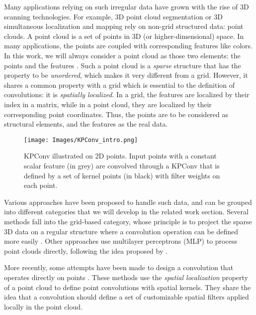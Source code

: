 \documentclass[10pt,twocolumn,letterpaper]{article}
\begin{document}
Many applications relying on such irregular data have grown with the rise of 3D scanning technologies. For example, 3D point cloud segmentation or 3D simultaneous localization and mapping rely on non-grid structured data: point clouds. A point cloud is a set of points in 3D (or higher-dimensional) space. In many applications, the points are coupled with corresponding features like colors. In this work, we will always consider a point cloud as those two elements: the points  and the features . Such a point cloud is a \textit{sparse} structure that has the property to be \textit{unordered}, which makes it very different from a grid. However, it shares a common property with a grid which is essential to the definition of convolutions: it is \textit{spatially localized}. In a grid, the features are localized by their index in a matrix, while in a point cloud, they are localized by their corresponding point coordinates. Thus, the points are to be considered as structural elements, and the features as the real data.

\begin{figure}[b]
    \vspace{-3.5ex}
    \centering
    \texttt{[image: Images/KPConv\_intro.png]}
    \caption{KPConv illustrated on 2D points. Input points with a constant scalar feature (in grey) are convolved through a KPConv that is defined by a set of kernel points (in black) with filter weights on each point.}
    \label{fig_intro}
\end{figure}

Various approaches have been proposed to handle such data, and can be grouped into different categories that we will develop in the related work section. Several methods fall into the grid-based category, whose principle is to project the sparse 3D data on a regular structure where a convolution operation can be defined more easily \cite{maturana2015voxnet, riegler2017octnet, su2018splatnet}. Other approaches use multilayer perceptrons (MLP) to process point clouds directly, following the idea proposed by \cite{zaheer2017deep, qi2017pointnet}.

More recently, some attempts have been made to design a convolution that operates directly on points \cite{atzmon2018point, xu2018spidercnn, li2018pointcnn, hua2018pointwise, hermosilla2018monte}. These methods use the \textit{spatial localization} property of a point cloud to define point convolutions with spatial kernels. They share the idea that a convolution should define a set of customizable spatial filters applied locally in the point cloud. 
\end{document}
